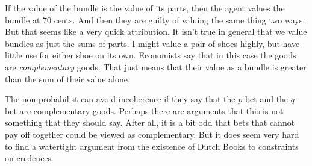 If the value of the bundle is the value of its parts, then the agent values the bundle at 70 cents. And then they are guilty of valuing the same thing two ways. But that seems like a very quick attribution. It isn't true in general that we value bundles as just the sums of parts. I might value a pair of shoes highly, but have little use for either shoe on its own. Economists say that in this case the goods are \textit{complementary} goods. That just means that their value as a bundle is greater than the sum of their value alone.

The non-probabilist can avoid incoherence if they say that the $p$-bet and the $q$-bet are complementary goods. Perhaps there are arguments that this is not something that they should say. After all, it is a bit odd that bets that cannot pay off together could be viewed as complementary. But it does seem very hard to find a watertight argument from the existence of Dutch Books to constraints on credences.
